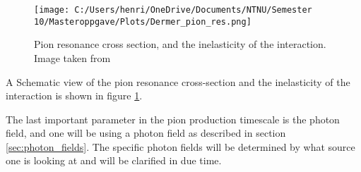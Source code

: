 \begin{figure}
    \centering
    \texttt{[image: C:/Users/henri/OneDrive/Documents/NTNU/Semester 10/Masteroppgave/Plots/Dermer\_pion\_res.png]}
    \caption{Pion resonance cross section, and the inelasticity of the interaction. Image taken from \cite{BHradiation}}
    \label{fig:pion_res}
\end{figure}
A Schematic view of the pion resonance cross-section and the inelasticity of the interaction is shown in figure \ref{fig:pion_res}. 

The last important parameter in the pion production timescale is the photon field, and one will be using a photon field as described in section \ref{sec:photon_fields}. The specific photon fields will be determined by what source one is looking at and will be clarified in due time. 

